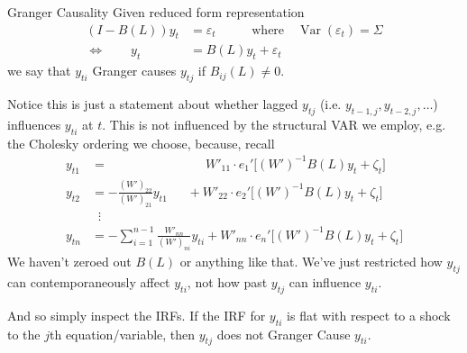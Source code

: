 \documentclass[aspectratio=169, handout]{beamer}
\newcommand{\Var}{\operatorname{Var}}
\begin{document}
{\scriptsize
\begin{frame}{Granger Causality}
Given reduced form representation
\begin{align*}
  (I-B(L))y_t
  &= \varepsilon_t
  \;\;\;\qquad\text{where}\quad
  \Var(\varepsilon_t)=\Sigma
  \\
  \iff\qquad
  y_t
  &= B(L)y_t + \varepsilon_t
\end{align*}
we say that $y_{ti}$ \alert{Granger causes} $y_{tj}$ if $B_{ij}(L)\neq
0$.

\pause
Notice this is just a statement about whether \alert{lagged} $y_{tj}$
(i.e. $y_{t-1,j},y_{t-2,j},\ldots$)
influences $y_{ti}$ at $t$.
This is not influenced by the structural VAR we employ, e.g. the
Cholesky ordering we choose, because, recall
\begin{align*}
  y_{t1}
  &=
  \qquad\quad
  \qquad\quad
  \quad
  \,\;\;
  W'_{11}
  \cdot
  e_1'\big[(W')^{-1}B(L)y_t + \zeta_t\big]
  \\
  y_{t2}
  &=
  -
  \frac{(W')_{22}}{(W')_{21}}
  y_{t1}
  \quad
  \;\;
  +
  W'_{22}
  \cdot
  e_2'\big[(W')^{-1}B(L)y_t + \zeta_t\big]
  \\
  & \;\;\vdots
  \\
  y_{tn}
  &=
  -
  \sum_{i=1}^{n-1}
  \frac{W'_{nn}}{(W')_{ni}}
  y_{ti}
  +
  W'_{nn}\cdot e_n'\big[(W')^{-1}B(L)y_t + \zeta_t\big]
\end{align*}
We haven't zeroed out $B(L)$ or anything like that.
We've just restricted how $y_{tj}$ can \alert{contemporaneously} affect
$y_{ti}$, \alert{not} how past $y_{tj}$ can influence $y_{ti}$.
\pause

And so simply inspect the IRFs.
If the IRF for $y_{ti}$ is \alert{flat} with respect to a shock to the
$j$th equation/variable, then $y_{tj}$ does not Granger Cause $y_{ti}$.
\end{frame}
}
\end{document}
